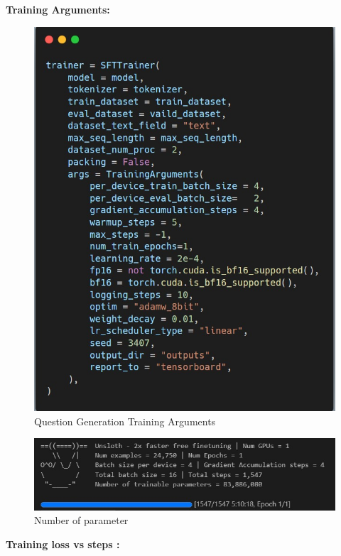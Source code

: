 \hfill \break
\textbf{Training Arguments:}
\begin{figure}[h!]
	\centering
	\includegraphics[scale=0.6]{figures/qg_argrs.png}
	\caption{ Question Generation Training Arguments }
\end{figure}

\newpage

\begin{figure}[h!]
	\centering
	\includegraphics[scale=0.6]{figures/qg_info.jpeg}
	\caption{ Number of parameter  }
\end{figure}


\hfill \break
\textbf{Training loss vs steps :}

